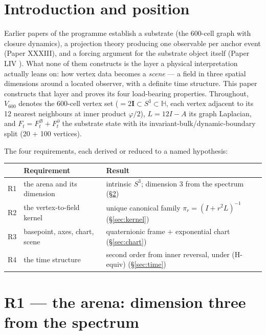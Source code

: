 \documentclass[12pt]{article}
\theoremstyle{definition}
\theoremstyle{remark}
\newcommand{\twoI}{2\mathbf{I}}
\newcommand{\Hq}{\mathbb{H}}
\newcommand{\Vsix}{V_{600}}
\begin{document}
\section{Introduction and position}\label{sec:intro}

Earlier papers of the programme establish a substrate (the 600-cell graph with closure dynamics), a projection theory producing one observable per anchor event (Paper XXXIII), and a forcing argument for the substrate object itself (Paper LIV \citep{SmartLIV}). What none of them constructs is the layer a physical interpretation actually leans on: how vertex data becomes a \emph{scene} --- a field in three spatial dimensions around a located observer, with a definite time structure. This paper constructs that layer and proves its four load-bearing properties. Throughout, $\Vsix$ denotes the 600-cell vertex set ($= \twoI \subset S^3 \subset \Hq$, each vertex adjacent to its 12 nearest neighbours at inner product $\varphi/2$), $L = 12I - A$ its graph Laplacian, and $F_t = F^{\mathcal B}_t + F^\partial_t$ the substrate state with its invariant-bulk/dynamic-boundary split (20 + 100 vertices).

The four requirements, each derived or reduced to a named hypothesis:

\begin{center}
\begin{tabular}{lll}
\toprule
 & Requirement & Result \\
\midrule
R1 & the arena and its dimension & intrinsic $S^3$; dimension 3 from the spectrum (\S\ref{sec:arena}) \\
R2 & the vertex-to-field kernel & unique canonical family $\pi_r = (I+r^2L)^{-1}$ (\S\ref{sec:kernel}) \\
R3 & basepoint, axes, chart, scene & quaternionic frame + exponential chart (\S\ref{sec:chart}) \\
R4 & the time structure & second order from inner reversal, under (H-equiv) (\S\ref{sec:time}) \\
\bottomrule
\end{tabular}
\end{center}

\section{R1 --- the arena: dimension three from the spectrum}\label{sec:arena}
\end{document}

